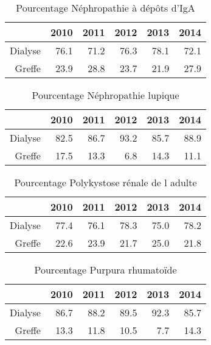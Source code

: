 \documentclass[11pt,a4paper]{article}\usepackage[]{graphicx}\usepackage[]{color}
\begin{document}
\begin{table}[H]
\centering
\begin{tabular}{rrrrrr}
  \hline
 & 2010 & 2011 & 2012 & 2013 & 2014 \\ 
  \hline
Dialyse & 76.1 & 71.2 & 76.3 & 78.1 & 72.1 \\ 
  Greffe & 23.9 & 28.8 & 23.7 & 21.9 & 27.9 \\ 
   \hline
\end{tabular}
\caption{Pourcentage Néphropathie à dépôts d'IgA} 
\end{table}
\begin{table}[H]
\centering
\begin{tabular}{rrrrrr}
  \hline
 & 2010 & 2011 & 2012 & 2013 & 2014 \\ 
  \hline
Dialyse & 82.5 & 86.7 & 93.2 & 85.7 & 88.9 \\ 
  Greffe & 17.5 & 13.3 & 6.8 & 14.3 & 11.1 \\ 
   \hline
\end{tabular}
\caption{Pourcentage Néphropathie lupique} 
\end{table}
\begin{table}[H]
\centering
\begin{tabular}{rrrrrr}
  \hline
 & 2010 & 2011 & 2012 & 2013 & 2014 \\ 
  \hline
Dialyse & 77.4 & 76.1 & 78.3 & 75.0 & 78.2 \\ 
  Greffe & 22.6 & 23.9 & 21.7 & 25.0 & 21.8 \\ 
   \hline
\end{tabular}
\caption{Pourcentage Polykystose rénale de l adulte} 
\end{table}
\begin{table}[H]
\centering
\begin{tabular}{rrrrrr}
  \hline
 & 2010 & 2011 & 2012 & 2013 & 2014 \\ 
  \hline
Dialyse & 86.7 & 88.2 & 89.5 & 92.3 & 85.7 \\ 
  Greffe & 13.3 & 11.8 & 10.5 & 7.7 & 14.3 \\ 
   \hline
\end{tabular}
\caption{Pourcentage Purpura rhumatoïde} 
\end{table}
\end{document}
